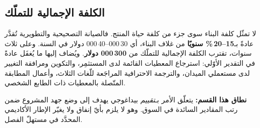 \subsection{الكلفة الإجمالية للتملّك}
لا تمثّل كلفة البناء سوى جزء من كلفة حياة المنتج. فالصيانة التصحيحية والتطويرية
تُقدَّر عادةً بـ\textbf{15--20\,\% سنويًا} من غلاف البناء، أي 30\,000--40\,000
دولار في السنة. وعلى ثلاث سنوات، تقترب الكلفة الإجمالية للتملّك من
\textbf{300\,000 دولار}. ويُضاف إليها ما يُغفَل عادةً في التقدير الأوّلي: استرجاع
المعطيات القائمة لدى المستثمِر، والتكوين ومرافقة التغيير لدى مستعملي الميدان،
والترجمة الاحترافية المراجَعة للّغات الثلاث، وأعمال المطابقة المتّصلة بالمعطيات
ذات الطابع الشخصي.

\begin{encadre}
\textbf{نطاق هذا القسم:} يتعلّق الأمر بـ\emph{تقييم} بيداغوجي يهدف إلى وضع جهد
المشروع ضمن رتب المقادير السائدة في السوق. وهو لا يلزم بأيّ إنفاق ولا يغيّر
الإطار الأكاديمي المحدَّد في مستهلّ الفصل.
\end{encadre}
